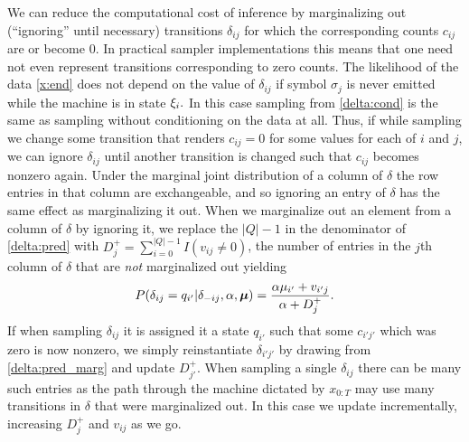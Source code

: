 We can reduce the computational cost of inference by marginalizing out (``ignoring'' until necessary) transitions $\delta_{ij}$ for which the corresponding counts $c_{ij}$ are or become 0.  In practical sampler implementations this means that one need not even represent transitions corresponding to zero counts.  The likelihood of the data \eqref{x:end} does not depend on the value of $\delta_{ij}$ if symbol $\sigma_j$ is never emitted while the machine is in state $\q_i.$   In this case sampling from \eqref{delta:cond} is the same as sampling without conditioning on the data at all.  Thus, if while sampling we change some transition that renders $c_{ij}=0$ for some values for each of $i$ and $j$, we can ignore $\delta_{ij}$ until another transition is changed such that $c_{ij}$ becomes nonzero again.  Under the marginal joint distribution of a column of $\delta$ the row entries in that column are exchangeable, and so ignoring an entry of $\delta$ has the same effect as marginalizing it out.  
When we marginalize out an element from a column of $\delta$ by ignoring it, we replace the $|Q| - 1$ in the denominator of \eqref{delta:pred} with $D^+_j = \sum_{i=0}^{|Q|-1}I(v_{ij}\neq0)$, the number of entries in the $j$th column of $\delta$ that are {\em not} marginalized out yielding
\begin{equation}
P(\delta_{ij} = q_{i'}|\delta_{-ij},\alpha,\bmu) = \frac{\alpha\mu_{i'} + v_{i'j}}{\alpha + D^+_j }. \label{delta:pred_marg}
\end{equation}
If when sampling $\delta_{ij}$ it is assigned it a state $q_{i'}$ such that some $c_{i'j'}$ which was zero is now nonzero, we simply reinstantiate $\delta_{i'j'}$ by drawing from \eqref{delta:pred_marg} and update $ D^+_{j'}$.  When sampling a single $\delta_{ij}$ there can be many such entries as the path through the machine dictated by $x_{0:T}$ may use many transitions in $\delta$ that were marginalized out.  In this case we update incrementally, increasing $D^+_j$ and $v_{ij}$ as we go.




